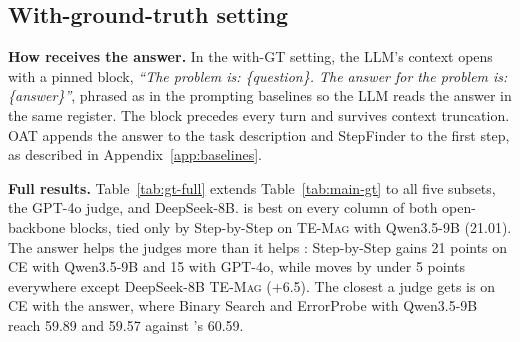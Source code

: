 \subsection{With-ground-truth setting}
\label{app:gt}

\textbf{How \soap{} receives the answer.}
In the with-GT setting, the LLM's context opens with a pinned block, \textit{``The problem is: \{question\}. The answer for the problem is: \{answer\}''}, phrased as in the prompting baselines so the LLM reads the answer in the same register. The block precedes every turn and survives context truncation. 
OAT appends the answer to the task description and StepFinder to the first step, as described in Appendix~\ref{app:baselines}.


\textbf{Full results.}
Table~\ref{tab:gt-full} extends Table~\ref{tab:main-gt} to all five subsets, the GPT-4o judge, and DeepSeek-8B. \soap{} is best on every column of both open-backbone blocks, tied only by Step-by-Step on \textsc{TE-Mag} with Qwen3.5-9B (21.01). The answer helps the judges more than it helps \soap{}: Step-by-Step gains 21 points on \textsc{CE} with Qwen3.5-9B and 15 with GPT-4o, while \soap{} moves by under 5 points everywhere except DeepSeek-8B \textsc{TE-Mag} (+6.5). The closest a judge gets is on \textsc{CE} with the answer, where Binary Search and ErrorProbe with Qwen3.5-9B reach 59.89 and 59.57 against \soap{}'s 60.59.


